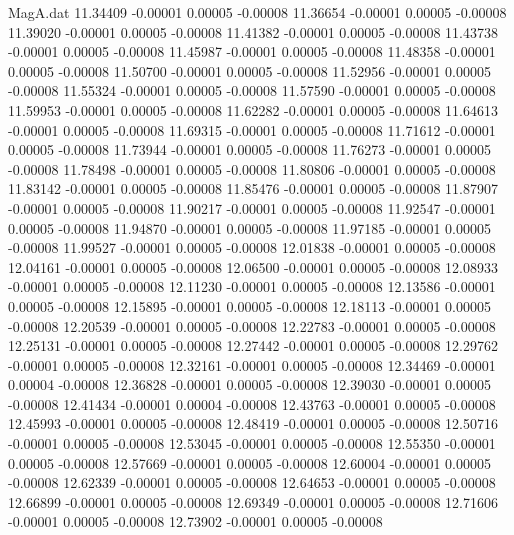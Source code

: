 \begin{filecontents}{MagA.dat}
  11.34409   -0.00001    0.00005   -0.00008
  11.36654   -0.00001    0.00005   -0.00008
  11.39020   -0.00001    0.00005   -0.00008
  11.41382   -0.00001    0.00005   -0.00008
  11.43738   -0.00001    0.00005   -0.00008
  11.45987   -0.00001    0.00005   -0.00008
  11.48358   -0.00001    0.00005   -0.00008
  11.50700   -0.00001    0.00005   -0.00008
  11.52956   -0.00001    0.00005   -0.00008
  11.55324   -0.00001    0.00005   -0.00008
  11.57590   -0.00001    0.00005   -0.00008
  11.59953   -0.00001    0.00005   -0.00008
  11.62282   -0.00001    0.00005   -0.00008
  11.64613   -0.00001    0.00005   -0.00008
  11.69315   -0.00001    0.00005   -0.00008
  11.71612   -0.00001    0.00005   -0.00008
  11.73944   -0.00001    0.00005   -0.00008
  11.76273   -0.00001    0.00005   -0.00008
  11.78498   -0.00001    0.00005   -0.00008
  11.80806   -0.00001    0.00005   -0.00008
  11.83142   -0.00001    0.00005   -0.00008
  11.85476   -0.00001    0.00005   -0.00008
  11.87907   -0.00001    0.00005   -0.00008
  11.90217   -0.00001    0.00005   -0.00008
  11.92547   -0.00001    0.00005   -0.00008
  11.94870   -0.00001    0.00005   -0.00008
  11.97185   -0.00001    0.00005   -0.00008
  11.99527   -0.00001    0.00005   -0.00008
  12.01838   -0.00001    0.00005   -0.00008
  12.04161   -0.00001    0.00005   -0.00008
  12.06500   -0.00001    0.00005   -0.00008
  12.08933   -0.00001    0.00005   -0.00008
  12.11230   -0.00001    0.00005   -0.00008
  12.13586   -0.00001    0.00005   -0.00008
  12.15895   -0.00001    0.00005   -0.00008
  12.18113   -0.00001    0.00005   -0.00008
  12.20539   -0.00001    0.00005   -0.00008
  12.22783   -0.00001    0.00005   -0.00008
  12.25131   -0.00001    0.00005   -0.00008
  12.27442   -0.00001    0.00005   -0.00008
  12.29762   -0.00001    0.00005   -0.00008
  12.32161   -0.00001    0.00005   -0.00008
  12.34469   -0.00001    0.00004   -0.00008
  12.36828   -0.00001    0.00005   -0.00008
  12.39030   -0.00001    0.00005   -0.00008
  12.41434   -0.00001    0.00004   -0.00008
  12.43763   -0.00001    0.00005   -0.00008
  12.45993   -0.00001    0.00005   -0.00008
  12.48419   -0.00001    0.00005   -0.00008
  12.50716   -0.00001    0.00005   -0.00008
  12.53045   -0.00001    0.00005   -0.00008
  12.55350   -0.00001    0.00005   -0.00008
  12.57669   -0.00001    0.00005   -0.00008
  12.60004   -0.00001    0.00005   -0.00008
  12.62339   -0.00001    0.00005   -0.00008
  12.64653   -0.00001    0.00005   -0.00008
  12.66899   -0.00001    0.00005   -0.00008
  12.69349   -0.00001    0.00005   -0.00008
  12.71606   -0.00001    0.00005   -0.00008
  12.73902   -0.00001    0.00005   -0.00008

\end{filecontents}
